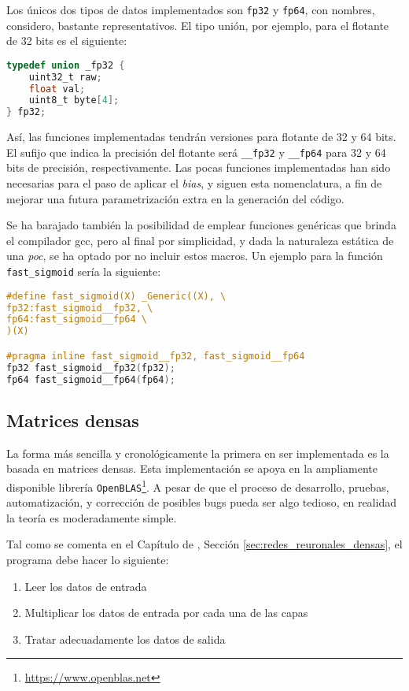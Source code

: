 Los únicos dos tipos de datos implementados son \texttt{fp32} y \texttt{fp64}, con nombres, considero, bastante representativos. El tipo unión, por ejemplo, para el flotante de 32 bits es el siguiente:\medskip
\begin{lstlisting}[language=C]
typedef union _fp32 {
    uint32_t raw;
    float val;
    uint8_t byte[4];
} fp32;
\end{lstlisting}

Así, las funciones implementadas tendrán versiones para flotante de 32 y 64 bits. El sufijo que indica la precisión del flotante será \texttt{\_\_fp32} y \texttt{\_\_fp64} para 32 y 64 bits de precisión, respectivamente. Las pocas funciones implementadas han sido necesarias para el paso de aplicar el \textit{bias}, y siguen esta nomenclatura, a fin de mejorar una futura parametrización extra en la generación del código.

Se ha barajado también la posibilidad de emplear funciones genéricas que brinda el compilador gcc, pero al final por simplicidad, y dada la naturaleza estática de una \textit{\acrlong{poc}}, se ha optado por no incluir estos macros. Un ejemplo para la función \texttt{fast\_sigmoid} sería la siguiente:\medskip
\begin{lstlisting}[language=C]
#define fast_sigmoid(X) _Generic((X), \
fp32:fast_sigmoid__fp32, \
fp64:fast_sigmoid__fp64 \
)(X)

#pragma inline fast_sigmoid__fp32, fast_sigmoid__fp64
fp32 fast_sigmoid__fp32(fp32);
fp64 fast_sigmoid__fp64(fp64);
\end{lstlisting}


\subsection{Matrices densas}
\label{ssec_gdin_matrices_densas}
La forma más sencilla y cronológicamente la primera en ser implementada es la basada en matrices densas. Esta implementación se apoya en la ampliamente disponible librería \texttt{OpenBLAS}\footnote{\url{https://www.openblas.net}}. A pesar de que el proceso de desarrollo, pruebas, automatización, y corrección de posibles bugs pueda ser algo tedioso, en realidad la teoría es moderadamente simple.

Tal como se comenta en el Capítulo de , Sección \ref{sec:redes_reuronales_densas}, el programa debe hacer lo siguiente:

\begin{enumerate}
    \item Leer los datos de entrada
    \item Multiplicar los datos de entrada por cada una de las capas
    \item Tratar adecuadamente los datos de salida
\end{enumerate}

